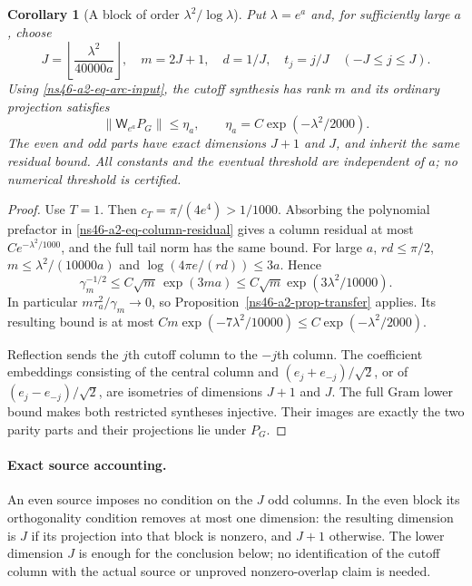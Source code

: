 \documentclass[11pt]{article}
\newtheorem{corollary}[theorem]{Corollary}
\theoremstyle{remark}
\begin{document}
\begin{corollary}[A block of order $\lambda^2/\log\lambda$]
\label{ns46-a2-cor-large-block}
Put $\lambda=e^a$ and, for sufficiently large $a$, choose
\[
 J=\left\lfloor\frac{\lambda^2}{40000a}\right\rfloor,
 \quad m=2J+1,\quad d=1/J,\quad t_j=j/J\quad(-J\le j\le J).
\]
Using \eqref{ns46-a2-eq-arc-input}, the cutoff synthesis has
rank $m$ and its ordinary projection satisfies
\begin{equation}\label{ns46-a2-eq-large-residual}
 \|\mathsf W_{e^a}P_G\|\le\eta_a,
 \qquad \eta_a=C\exp(-\lambda^2/2000).
\end{equation}
The even and odd parts have exact dimensions $J+1$ and $J$,
and inherit the same residual bound. All constants and the eventual
threshold are independent of $a$; no numerical threshold is certified.
\end{corollary}
\begin{proof}
Use $T=1$. Then $c_T=\pi/(4e^4)>1/1000$.
Absorbing the polynomial prefactor in
\eqref{ns46-a2-eq-column-residual} gives a column residual at most
$Ce^{-\lambda^2/1000}$, and the full tail norm has the same bound.
For large $a$, $rd\le\pi/2$, $m\le\lambda^2/(10000a)$ and
$\log(4\pi e/(rd))\le3a$. Hence
\[
 \gamma_m^{-1/2}\le C\sqrt m\,
       \exp(3ma)\le C\sqrt m\exp(3\lambda^2/10000).
\]
In particular $m\tau_a^2/\gamma_m\to0$, so
Proposition~\ref{ns46-a2-prop-transfer} applies. Its resulting
bound is at most
$Cm\exp(-7\lambda^2/10000)\le C\exp(-\lambda^2/2000)$.

Reflection sends the $j$th cutoff column to the $-j$th column.
The coefficient embeddings consisting of the central column and
$(e_j+e_{-j})/\sqrt2$, or of $(e_j-e_{-j})/\sqrt2$, are
isometries of dimensions $J+1$ and $J$. The full Gram lower bound
makes both restricted syntheses injective. Their images are exactly
the two parity parts and their projections lie under $P_G$.
\end{proof}

\paragraph{Exact source accounting.}
An even source imposes no condition on the $J$ odd columns. In the
even block its orthogonality condition removes at most one dimension:
the resulting dimension is $J$ if its projection into that block is
nonzero, and $J+1$ otherwise. The lower dimension $J$ is enough for
the conclusion below; no identification of the cutoff column with
the actual source or unproved nonzero-overlap claim is needed.
\end{document}
